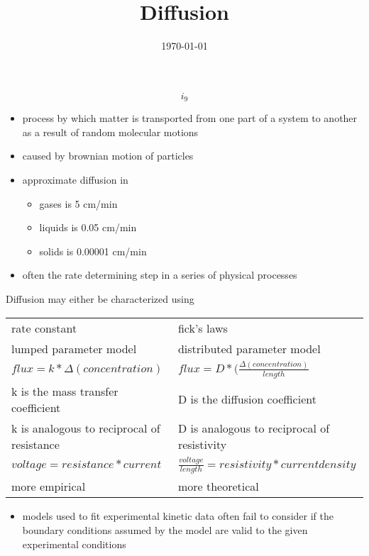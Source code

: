 \documentclass[11pt]{article}
\date{\today}
\title{Diffusion}
\begin{document}
\maketitle
\tableofcontents

\begin{equation}
i_9
\end{equation}

\begin{itemize}
\item process by which matter is transported from one part of a system to another as a result of random molecular motions
\item caused by brownian motion of particles
\item approximate diffusion in
\begin{itemize}
\item gases is 5 cm/min
\item liquids is 0.05 cm/min
\item solids is 0.00001 cm/min
\end{itemize}
\item often the rate determining step in a series of physical processes
\end{itemize}

Diffusion may either be characterized using 

\begin{center}
\begin{tabular}{ll}
rate constant & fick's laws\\
lumped parameter model & distributed parameter model\\
\(flux = k * \Delta(concentration)\) & \(flux = D * (\frac{\Delta(concentration)}{length}\)\\
k is the mass transfer coefficient & D is the diffusion coefficient\\
k is analogous to reciprocal of resistance & D is analogous to reciprocal of resistivity\\
\(voltage = resistance * current\) & \(\frac{voltage}{length}= resistivity * current density\)\\
more empirical & more theoretical\\
\end{tabular}
\end{center}

\begin{itemize}
\item models used to fit experimental kinetic data often fail to consider if the boundary conditions assumed by the model are valid to the given experimental conditions \cite{Qiu2009}
\end{itemize}
\end{document}
